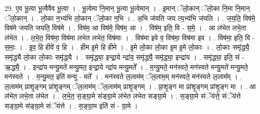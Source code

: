 \documentclass[17pt]{extarticle}
\begin{document}
29. ए॒व भू॒त्वा भू॒त्वैवैव भू॒त्वा । . भू॒त्वेमा नि॒मान् भू॒त्वा भू॒त्वेमान् । . इ॒मान् ॅलो॒कान् ॅलो॒का नि॒मा नि॒मान् ॅलो॒कान् । . लो॒का न॒भ्य॑भि लो॒कान् ॅलो॒का न॒भि । . अ॒भि ज॑यति जय त्य॒भ्य॑भि ज॑यति । . ज॒य॒ति॒ विष॑मे॒ विष॑मे जयति जयति॒ विष॑मे । . विष॑म॒ आ विष॑मे॒ विष॑म॒ आ । . विष॑म॒ इति॒ वि - स॒मे॒ । . आ ल॑भेत लभे॒ता ल॑भेत । . ल॒भे॒त॒ विष॑मा॒ विष॑मा लभेत लभेत॒ विष॑माः । . विष॑मा इवे व॒ विष॑मा॒ विष॑मा इव । . विष॑मा॒ इति॒ वि - स॒माः॒ । . इ॒व॒ हि हीवे॑ व॒ हि । . हीम इ॒मे हि हीमे । . इ॒मे लो॒का लो॒का इ॒म इ॒मे लो॒काः । . लो॒काः समृ॑द्ध्यै॒ समृ॑द्ध्यै लो॒का लो॒काः समृ॑द्ध्यै । . समृ॑द्ध्या॒ इन्द्रा॒ये न्द्रा॑य॒ समृ॑द्ध्यै॒ समृ॑द्ध्या॒ इन्द्रा॑य । . समृ॑द्ध्या॒ इति॒ सं - ऋ॒द्ध्यै॒ । . इन्द्रा॑य मन्यु॒मते॑ मन्यु॒मत॒ इन्द्रा॒ये न्द्रा॑य मन्यु॒मते᳚ । . म॒न्यु॒मते॒ मन॑स्वते॒ मन॑स्वते मन्यु॒मते॑ मन्यु॒मते॒ मन॑स्वते । . म॒न्यु॒मत॒ इति॑ मन्यु - मते᳚ । . मन॑स्वते ल॒लाम॑म् ॅल॒लाम॒म् मन॑स्वते॒ मन॑स्वते ल॒लाम᳚म् । . ल॒लाम॑म् प्राशृ॒ङ्गम् प्रा॑शृ॒ङ्गम् ॅल॒लाम॑म् ॅल॒लाम॑म् प्राशृ॒ङ्गम् । . प्रा॒शृ॒ङ्ग मा प्रा॑शृ॒ङ्गम् प्रा॑शृ॒ङ्ग मा । . आ ल॑भेत लभे॒ता ल॑भेत । . ल॒भे॒त॒ स॒ङ्ग्रा॒मे स॑ङ्ग्रा॒मे ल॑भेत लभेत सङ्ग्रा॒मे । . स॒ङ्ग्रा॒मे संॅय॑त्ते॒ संॅय॑त्ते सङ्ग्रा॒मे स॑ङ्ग्रा॒मे संॅय॑त्ते । . स॒ङ्ग्रा॒म इति॑ सं - ग्रा॒मे । \newline
\end{document}
